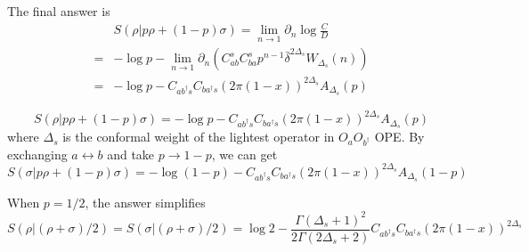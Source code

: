 \documentclass{article}
\theoremstyle{plain}
\theoremstyle{definition}
\theoremstyle{plain}
\begin{document}

The final answer is
\begin{equation}
\begin{aligned}
 &S(\rho|p\rho+(1-p)\sigma)=\lim_{n\to 1}\partial_n \log\frac{C}{D} \\
=& -\log p -\lim_{n\to 1}\partial_n (C_{ab}^s C_{ba}^s p^{n-1} \bar \delta^{2\Delta_s} W_{\Delta_s}(n))\\
=&-\log p - C_{ab^\dagger s} C_{ba^\dagger s} (2\pi (1-x))^{2\Delta_s} A_{\Delta_s} (p)
\end{aligned}
\end{equation}

\begin{equation}
   \boxed{ S(\rho|p\rho+(1-p)\sigma)= -\log p - C_{ab^\dagger s} C_{ba^\dagger s} (2\pi (1-x))^{2\Delta_s} A_{\Delta_s} (p)}
\end{equation}
where $\Delta_s$ is the conformal weight of the lightest operator in $O_a O_{b^\dagger}$ OPE. By exchanging $a \leftrightarrow b$ and take $p\to 1-p$, we can get
\begin{equation}
   \boxed{ S(\sigma|p\rho+(1-p)\sigma)= -\log (1-p) - C_{ab^\dagger s} C_{ba^\dagger s} (2\pi (1-x))^{2\Delta_s} A_{\Delta_s} (1-p)}
\end{equation}


When $p=1/2$, the answer simplifies
\begin{equation}
   \boxed{ S(\rho|(\rho+\sigma)/2)=S(\sigma|(\rho+\sigma)/2)= \log 2 - \frac{\Gamma(\Delta_s+1)^2}{2\Gamma(2\Delta_s+2)}C_{ab^\dagger s} C_{ba^\dagger s} (2\pi (1-x))^{2\Delta_s}  }
\end{equation}

\end{document}
